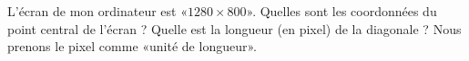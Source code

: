 
\begin{exercice}\label{exoSeconde-0004}

    L'écran de mon ordinateur est «\( 1280\times 800\)». Quelles sont les coordonnées du point central de l'écran ? Quelle est la longueur (en pixel) de la diagonale ? Nous prenons le pixel comme «unité de longueur».

\end{exercice}
